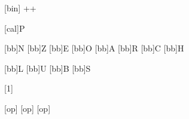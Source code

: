 [bin]
  {+\!\!+}



[cal]{P}


  [bb]{N}
  [bb]{Z}
  [bb]{E}
  [bb]{O}
  [bb]{A}
  [bb]{R}
  [bb]{C}
  [bb]{H}

  [bb]{L}
  [bb]{U}
  [bb]{B}
[bb]{S}

\let\to\rightarrow
\let\implies\Rightarrow
\let\infers\vdash



[1]
  {\quad{}}

[op]
  {}
[op]
  {}
[op]
  {}



\let\group\begingroup

\newenvironment*{marginequation}[1][1=0pt]
  {\begin{marginfigure}[#1]\equation}
  {\endequation\end{marginfigure}}

\newenvironment*{marginequation*}[1][1=0pt]
  {\begin{marginfigure}[#1]\equation\nonumber}
  {\endequation\end{marginfigure}}

\newenvironment*{grammar}
  {\begin{block}\begin{tabular}{@{}rRCLl}}
  {\end{tabular}\end{block}}
